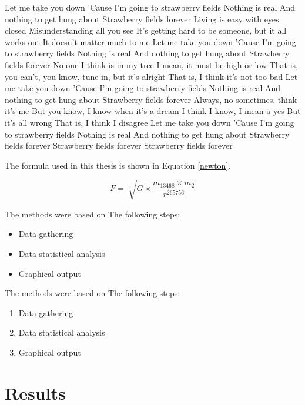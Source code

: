 \documentclass[12pt]{article}
\begin{document}
Let me take you down
'Cause I'm going to strawberry fields
Nothing is real
And nothing to get hung about
Strawberry fields forever
Living is easy with eyes closed
Misunderstanding all you see
It's getting hard to be someone, but it all works out
It doesn't matter much to me
Let me take you down
'Cause I'm going to strawberry fields
Nothing is real
And nothing to get hung about
Strawberry fields forever
No one I think is in my tree
I mean, it must be high or low
That is, you can't, you know, tune in, but it's alright
That is, I think it's not too bad
Let me take you down
'Cause I'm going to strawberry fields
Nothing is real
And nothing to get hung about
Strawberry fields forever
Always, no sometimes, think it's me
But you know, I know when it's a dream
I think I know, I mean a yes
But it's all wrong
That is, I think I disagree
Let me take you down
'Cause I'm going to strawberry fields
Nothing is real
And nothing to get hung about
Strawberry fields forever
Strawberry fields forever
Strawberry fields forever

The formula used in this thesis is shown in Equation \ref{newton}.

\begin{equation}
    F = \sqrt[n]{G \times \frac{m_{13468} \times m_2}{r^{265756}}}
    \label{newton}
\end{equation}

The methods were based on The following steps:
\begin{itemize}
    \item Data gathering
    \item Data statistical analysis
    \item Graphical output
\end{itemize}

The methods were based on The following steps:
\begin{enumerate}
    \item Data gathering
    \item Data statistical analysis
    \item Graphical output
\end{enumerate}

\section{Results}
\end{document}
